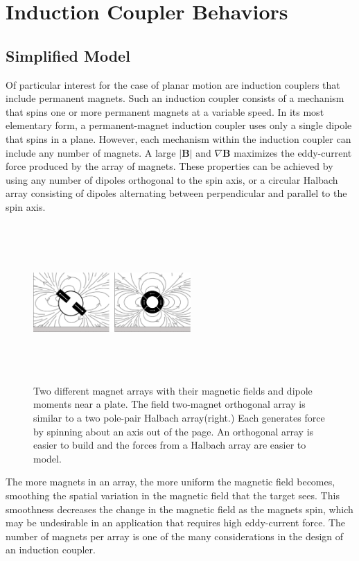 \section{Induction Coupler Behaviors}
\label{sec:behavior}
\subsection{Simplified Model}
\label{sec:simple_model}
Of particular interest for the case of planar motion are induction couplers that include permanent magnets. Such an induction coupler consists of a mechanism that spins one or more permanent magnets at a variable speed. In its most elementary form, a permanent-magnet induction coupler uses only a single dipole that spins in a plane. However, each mechanism within the induction coupler can include any number of magnets. A large $\vert \textbf{B} \vert$ and $\nabla \textbf{B}$ maximizes the eddy-current force produced by the array of magnets. These properties can be achieved by using any number of dipoles orthogonal to the spin axis, or a circular Halbach array consisting of dipoles alternating between perpendicular and parallel to the spin axis.

\begin{figure}
\includegraphics[width = 6cm, height = 6cm ]{figures/two_different_arrays.eps}

\caption{Two different magnet arrays with their magnetic fields and dipole moments near a plate. The field two-magnet orthogonal array is similar to a two pole-pair Halbach array(right.) Each generates force by spinning about an axis out of the page. An orthogonal array is easier to build and the forces from a Halbach array are easier to model.  }
\label{fig:magnet_arrays}
\end{figure}

The more magnets in an array, the more uniform the magnetic field becomes, smoothing the spatial variation in the magnetic field that the target sees. This smoothness decreases the change in the magnetic field as the magnets spin, which may be undesirable in an application that requires high eddy-current force. The number of magnets per array is one of the many considerations in the design of an induction coupler.

